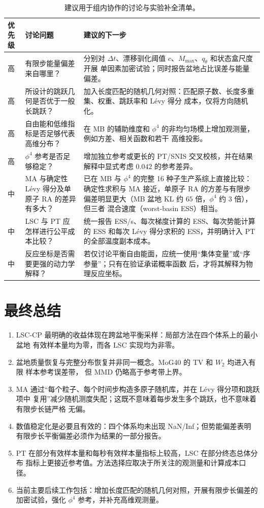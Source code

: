 \documentclass[11pt,a4paper]{article}
\begin{document}
\begin{table}[H]
\centering
\small
\begin{tabularx}{\textwidth}{C{1.3cm}L{4.3cm}Y}
\toprule
优先级 & 讨论问题 & 建议的下一步 \\
\midrule
高 &
有限步能量偏差来自哪里？ &
分别对 $\Delta t$、漂移驯化阈值 $c$、$M_{\max}$、$q_\theta$ 和状态盒尺度开展
单因素加密试验；同时报告盆地占比误差与能量偏差。 \\
高 &
所设计的跳跃几何是否优于一般长跳跃？ &
加入长度匹配的随机几何对照：匹配原子数、长度多重集、权重、跳跃率和 Lévy 得分
成本，仅将方向随机化。 \\
高 &
自由能和低维指标是否足够代表高维分布？ &
在 MB 的辅助维度和 $\phi^4$ 的非均匀场模上增加观测量，例如方差、相关函数和若干
高维投影。 \\
高 &
$\phi^4$ 参考是否足够稳定？ &
增加独立参考或更长的 PT/SNIS 交叉校核，并在结果解释中显式考虑 $0.042$ 的参考差异。 \\
中 &
MA 与确定性 Lévy 得分及单原子 RA 的差异有多大？ &
已在 MB 与 $\phi^4$ 的完整 16 种子生产系综上直接比较：确定性求积与 MA 接近，单原子
RA 的方差与有限步偏差明显更大（MB 盆地 KL 约 $65$ 倍，$\phi^4$ 约 $3$ 倍），但三者
混合速度（worst-basin ESS）相当。 \\
中 &
LSC 与 PT 应怎样进行公平成本比较？ &
统一报告 ESS/s、每次梯度计算的 ESS、每次势能计算的 ESS 和每次 Lévy 得分求积的
ESS，并明确计入 PT 的全部温度副本成本。 \\
中 &
反应坐标是否需要更强的动力学解释？ &
若仅讨论平衡自由能面，应统一使用“集体变量”或“序参量”；只有在验证承诺概率函数
后，才将其解释为物理反应坐标。 \\
\bottomrule
\end{tabularx}
\caption{建议用于组内协作的讨论与实验补全清单。}
\end{table}

\section{最终总结}

\begin{enumerate}
 \item LSC-CP 最明确的收益体现在跨盆地平衡采样：局部方法在四个体系上的最小盆地
 有效样本量均为零，而各 LSC 实现均为非零。
 \item 盆地质量恢复与完整分布恢复并非同一概念。MoG40 的 TV 和 $W_2$ 均进入有限
 样本参考误差带，
 但 MMD 仍略高于参考带上界。
 \item MA 通过“每个粒子、每个时间步构造多原子随机库，并在 Lévy 得分项和跳跃项中
 复用”减少随机测度失配；这既不意味着每步发生多个跳跃，也不意味着有限步长链严格
 无偏。
 \item 数值稳定化是必要且有效的：四个体系均未出现 NaN/Inf；但势能偏差表明
 有限步长平衡偏差必须作为结果的一部分报告。
 \item PT 在部分有效样本量和每秒有效样本量指标上较高，LSC 在部分终态总体分布
 指标上更接近参考值。方法选择应取决于所关注的观测量和计算成本口径。
 \item 当前主要后续工作包括：增加长度匹配的随机几何对照，开展有限步长偏差的
 加密试验，强化 $\phi^4$ 参考，并补充高维观测量。
\end{enumerate}
\end{document}

